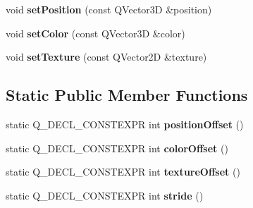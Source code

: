 \begin{DoxyCompactItemize}
\item 
void {\bfseries set\+Position} (const Q\+Vector3D \&position)\hypertarget{class_vertex_a8da242585395d719b1bd1163895bd80d}{}\label{class_vertex_a8da242585395d719b1bd1163895bd80d}

\item 
void {\bfseries set\+Color} (const Q\+Vector3D \&color)\hypertarget{class_vertex_ae8a764bdc15d2fa9a2ccc766281651b1}{}\label{class_vertex_ae8a764bdc15d2fa9a2ccc766281651b1}

\item 
void {\bfseries set\+Texture} (const Q\+Vector2D \&texture)\hypertarget{class_vertex_af2431ad04447683698e814209c84325f}{}\label{class_vertex_af2431ad04447683698e814209c84325f}

\end{DoxyCompactItemize}
\subsection*{Static Public Member Functions}
\begin{DoxyCompactItemize}
\item 
static Q\+\_\+\+D\+E\+C\+L\+\_\+\+C\+O\+N\+S\+T\+E\+X\+PR int {\bfseries position\+Offset} ()\hypertarget{class_vertex_af1fbdec4ee8d94820f060576c804cc08}{}\label{class_vertex_af1fbdec4ee8d94820f060576c804cc08}

\item 
static Q\+\_\+\+D\+E\+C\+L\+\_\+\+C\+O\+N\+S\+T\+E\+X\+PR int {\bfseries color\+Offset} ()\hypertarget{class_vertex_acdbc97e99155c9c5b9cd3a6391544f9c}{}\label{class_vertex_acdbc97e99155c9c5b9cd3a6391544f9c}

\item 
static Q\+\_\+\+D\+E\+C\+L\+\_\+\+C\+O\+N\+S\+T\+E\+X\+PR int {\bfseries texture\+Offset} ()\hypertarget{class_vertex_a577d17cf27998178564be755d43e3874}{}\label{class_vertex_a577d17cf27998178564be755d43e3874}

\item 
static Q\+\_\+\+D\+E\+C\+L\+\_\+\+C\+O\+N\+S\+T\+E\+X\+PR int {\bfseries stride} ()\hypertarget{class_vertex_a966a81701eacd6bad774bdf3b39bb895}{}\label{class_vertex_a966a81701eacd6bad774bdf3b39bb895}

\end{DoxyCompactItemize}
